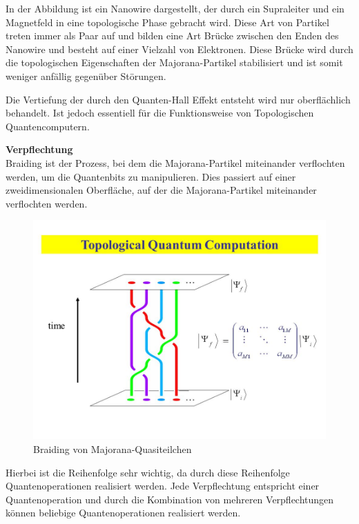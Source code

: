 In der Abbildung ist ein Nanowire dargestellt, der durch ein Supraleiter und ein Magnetfeld in eine topologische Phase gebracht wird.
Diese Art von Partikel treten immer als Paar auf und bilden eine Art Brücke zwischen den Enden des Nanowire und besteht auf einer Vielzahl von Elektronen.
Diese Brücke wird durch die topologischen Eigenschaften der Majorana-Partikel stabilisiert und ist somit weniger anfällig gegenüber Störungen.\\


\begin{tcolorbox}[title=Kommentar,
    title filled=false,
    colback=cyan!5!white,
    colframe=cyan!75!black]
    Die Vertiefung der durch den Quanten-Hall Effekt entsteht wird nur oberflächlich behandelt. Ist jedoch essentiell für die Funktionsweise von Topologischen Quantencomputern.
\end{tcolorbox}

\textbf{Verpflechtung}\\
Braiding ist der Prozess, bei dem die Majorana-Partikel miteinander verflochten werden, um die Quantenbits zu manipulieren. 
Dies passiert auf einer zweidimensionalen Oberfläche, auf der die Majorana-Partikel miteinander verflochten werden.\\

\begin{figure}[H]
    \centering
    \includegraphics[width=0.75\linewidth]{img/TQC.png}
    \caption{Braiding von Majorana-Quasiteilchen}
    \label{fig:Braiding}
\end{figure}

Hierbei ist die Reihenfolge sehr wichtig, da durch diese Reihenfolge Quantenoperationen realisiert werden.
Jede Verpflechtung entspricht einer Quantenoperation und durch die Kombination von mehreren Verpflechtungen können beliebige Quantenoperationen realisiert werden.\\

